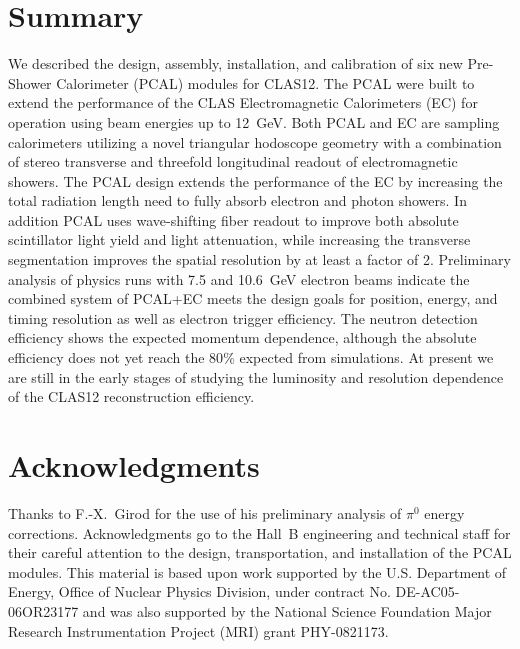 \section{Summary}

We described the design, assembly, installation, and calibration of six new Pre-Shower Calorimeter (PCAL) modules
for CLAS12. The PCAL were built to extend the performance of the CLAS Electromagnetic Calorimeters (EC) for
operation using beam energies up to 12~GeV. Both PCAL and EC are sampling calorimeters utilizing a novel triangular
hodoscope geometry with a combination of stereo transverse and threefold longitudinal readout of electromagnetic
showers. The PCAL design extends the performance of the EC by increasing the total radiation length need to fully
absorb electron and photon showers.  In addition PCAL uses wave-shifting fiber readout to improve both absolute
scintillator light yield and light attenuation, while increasing the transverse segmentation improves the spatial
resolution by at least a factor of 2. Preliminary analysis of physics runs with 7.5 and 10.6~GeV electron beams
indicate the combined system of PCAL+EC meets the design goals for position, energy, and timing resolution as well
as electron trigger efficiency. The neutron detection efficiency shows the expected momentum dependence, although
the absolute efficiency does not yet reach the 80$\%$ expected from simulations. At present we are still in the early
stages of studying the luminosity and resolution dependence of the CLAS12 reconstruction efficiency.

\section*{Acknowledgments}

Thanks to F.-X.~Girod for the use of his preliminary analysis of $\pi^0$ energy corrections. Acknowledgments go to 
the Hall~B engineering and technical staff for their
careful attention to the design, transportation, and installation of the PCAL modules. This material is based upon
work supported by the U.S. Department of Energy, Office of Nuclear Physics Division, under contract No.
DE-AC05-06OR23177 and was also supported by the National Science Foundation Major Research Instrumentation
Project (MRI) grant PHY-0821173.





